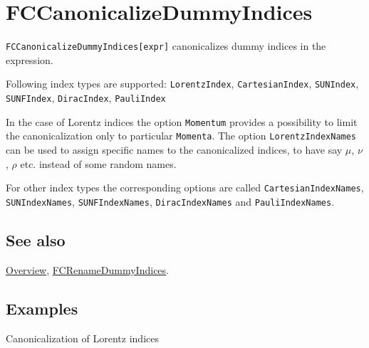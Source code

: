 \documentclass[../FeynCalcManual.tex]{subfiles}
\begin{document}
\hypertarget{fccanonicalizedummyindices}{
\section{FCCanonicalizeDummyIndices}\label{fccanonicalizedummyindices}}

\texttt{FCCanonicalizeDummyIndices[\allowbreak{}expr]} canonicalizes
dummy indices in the expression.

Following index types are supported: \texttt{LorentzIndex},
\texttt{CartesianIndex}, \texttt{SUNIndex}, \texttt{SUNFIndex},
\texttt{DiracIndex}, \texttt{PauliIndex}

In the case of Lorentz indices the option \texttt{Momentum} provides a
possibility to limit the canonicalization only to particular
\texttt{Momenta}. The option \texttt{LorentzIndexNames} can be used to
assign specific names to the canonicalized indices, to have say \(\mu\),
\(\nu\), \(\rho\) etc. instead of some random names.

For other index types the corresponding options are called
\texttt{CartesianIndexNames}, \texttt{SUNIndexNames},
\texttt{SUNFIndexNames}, \texttt{DiracIndexNames} and
\texttt{PauliIndexNames}.

\subsection{See also}

\hyperlink{toc}{Overview},
\hyperlink{fcrenamedummyindices}{FCRenameDummyIndices}.

\subsection{Examples}

Canonicalization of Lorentz indices

\begin{Shaded}
\begin{Highlighting}[]
\OperatorTok{[}\OperatorTok{,}\OperatorTok{]}\OperatorTok{[}\OperatorTok{,}\OperatorTok{]} \SpecialCharTok{+}\OperatorTok{[}\OperatorTok{,}\OperatorTok{]}\OperatorTok{[}\OperatorTok{,}\OperatorTok{]} \SpecialCharTok{+}\OperatorTok{[}\OperatorTok{,}\OperatorTok{]}\OperatorTok{[}\OperatorTok{,}\OperatorTok{]} 
 
\OperatorTok{[}\SpecialCharTok{\%}\OperatorTok{]} \SpecialCharTok{//}
\end{Highlighting}
\end{Shaded}
\end{document}
